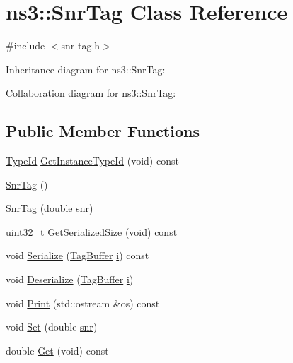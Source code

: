 \hypertarget{classns3_1_1SnrTag}{}\section{ns3\+:\+:Snr\+Tag Class Reference}
\label{classns3_1_1SnrTag}


{\ttfamily \#include $<$snr-\/tag.\+h$>$}



Inheritance diagram for ns3\+:\+:Snr\+Tag\+:


Collaboration diagram for ns3\+:\+:Snr\+Tag\+:
\subsection*{Public Member Functions}
\begin{DoxyCompactItemize}
\item 
\hyperlink{classns3_1_1TypeId}{Type\+Id} \hyperlink{classns3_1_1SnrTag_aeef98310e1221b032823230fd1c13c1c}{Get\+Instance\+Type\+Id} (void) const 
\item 
\hyperlink{classns3_1_1SnrTag_adae16150cd21a990127de18988fe07d4}{Snr\+Tag} ()
\item 
\hyperlink{classns3_1_1SnrTag_a608b05afd1e7495bf8fffb61c942171b}{Snr\+Tag} (double \hyperlink{lte__pathloss_8m_ae6e82a215dff6b79fb6e9952a1b78453}{snr})
\item 
uint32\+\_\+t \hyperlink{classns3_1_1SnrTag_acce64acfd1b5bd6e93e2825df12b1f6c}{Get\+Serialized\+Size} (void) const 
\item 
void \hyperlink{classns3_1_1SnrTag_a4bce5deac7781af66c6989a6c7ba2da9}{Serialize} (\hyperlink{classns3_1_1TagBuffer}{Tag\+Buffer} \hyperlink{lte__uplink__power__control_8m_a6f6ccfcf58b31cb6412107d9d5281426}{i}) const 
\item 
void \hyperlink{classns3_1_1SnrTag_ac5306895cd87efb944b4d19426292ed9}{Deserialize} (\hyperlink{classns3_1_1TagBuffer}{Tag\+Buffer} \hyperlink{lte__uplink__power__control_8m_a6f6ccfcf58b31cb6412107d9d5281426}{i})
\item 
void \hyperlink{classns3_1_1SnrTag_aa263d5493003757ec0147c9a41ea3f25}{Print} (std\+::ostream \&os) const 
\item 
void \hyperlink{classns3_1_1SnrTag_a2f9d363bfdd81cf96b90e270eb2fc479}{Set} (double \hyperlink{lte__pathloss_8m_ae6e82a215dff6b79fb6e9952a1b78453}{snr})
\item 
double \hyperlink{classns3_1_1SnrTag_a73a7dd6609e2a3c797b2a6e6ce4be51f}{Get} (void) const 
\end{DoxyCompactItemize}
